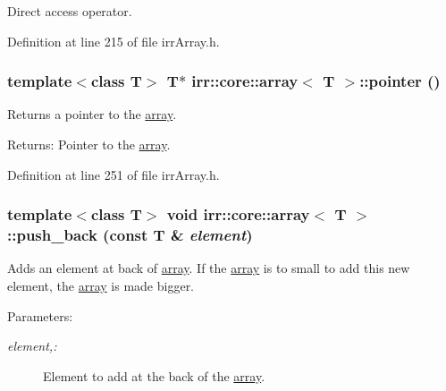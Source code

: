 Direct access operator. 



Definition at line 215 of file irrArray.h.\hypertarget{classirr_1_1core_1_1array_fe5fd668b288ea14a585144c62d99c03}{
\subsubsection[{pointer}]{\setlength{\rightskip}{0pt plus 5cm}template$<$class T$>$ T$\ast$ {\bf irr::core::array}$<$ T $>$::pointer ()}}
\label{classirr_1_1core_1_1array_fe5fd668b288ea14a585144c62d99c03}


Returns a pointer to the \hyperlink{classirr_1_1core_1_1array}{array}. \begin{Desc}
\item[Returns:]Pointer to the \hyperlink{classirr_1_1core_1_1array}{array}. \end{Desc}


Definition at line 251 of file irrArray.h.\hypertarget{classirr_1_1core_1_1array_95afc36513d08abb51bd399755730877}{
\subsubsection[{push\_\-back}]{\setlength{\rightskip}{0pt plus 5cm}template$<$class T$>$ void {\bf irr::core::array}$<$ T $>$::push\_\-back (const T \& {\em element})}}
\label{classirr_1_1core_1_1array_95afc36513d08abb51bd399755730877}


Adds an element at back of \hyperlink{classirr_1_1core_1_1array}{array}. If the \hyperlink{classirr_1_1core_1_1array}{array} is to small to add this new element, the \hyperlink{classirr_1_1core_1_1array}{array} is made bigger. \begin{Desc}
\item[Parameters:]
\begin{description}
\item[{\em element,:}]Element to add at the back of the \hyperlink{classirr_1_1core_1_1array}{array}. \end{description}
\end{Desc}


